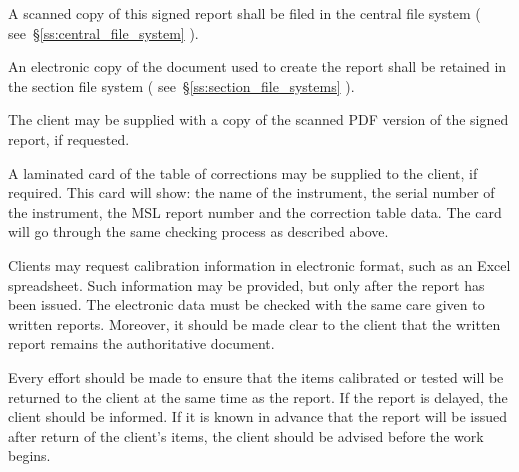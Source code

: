 A scanned copy of this signed report shall be filed in the central file system ( see~\S\ref{ss:central_file_system} ). 

An electronic copy of the document used to create the report shall be retained in the section file system ( see~\S\ref{ss:section_file_systems} ). 
   
The client may be supplied with a copy of the scanned PDF version of the signed report, if requested.

A laminated card of the table of corrections may be supplied to the client, if required.  This card will show: the name of the instrument, the serial number of the instrument, the MSL report number and the correction table data.  The card will go through the same checking process as described above.

Clients may request calibration information in electronic format, such as an Excel spreadsheet. Such information may be provided, but only after the report has been issued. The electronic data must be checked with the same care given to written reports. Moreover, it should be made clear to the client that the written report remains the authoritative document. 

Every effort should be made to ensure that the items calibrated or tested will be returned to the client at the same time as the report. If the report is delayed, the client should be informed. If it is known in advance that the report will be issued after return of the client’s items, the client should be advised before the work begins.


